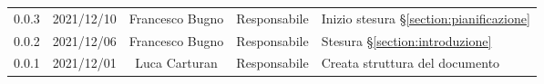 \begin{center}
\begin{longtable}[c]{c | c | c | c | p{5cm}}
		0.0.3                                                      & 2021/12/10 & Francesco Bugno                        & Responsabile   & Inizio stesura §\ref{section:pianificazione}                                                                                              \\
		0.0.2                                                      & 2021/12/06 & Francesco Bugno                        & Responsabile   & Stesura §\ref{section:introduzione}                                                                                                       \\
		0.0.1                                                      & 2021/12/01 & Luca Carturan                          & Responsabile   & Creata struttura del documento
	\end{longtable}
\end{center}